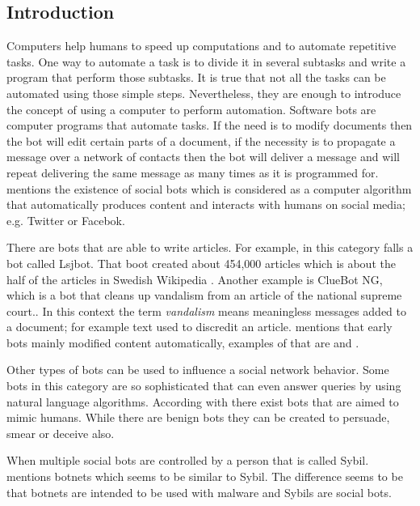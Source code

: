 \documentclass[twoside]{article}
\begin{document}
\begin{multicols}{2} %

\section{Introduction}
\lettrine[nindent=0em,lines=2]{C}omputers help humans to speed up computations and to automate repetitive tasks. One way to automate 
a task is to divide it in several subtasks and write a program that perform those subtasks. It is true that not all the tasks can be automated
using those simple steps. Nevertheless, they are enough to introduce the concept of using a computer to perform automation. Software bots 
are computer programs that automate tasks. If the need is to modify documents then the bot will edit certain parts of a document, if the
necessity is to propagate a message over a network of contacts then the bot will deliver a message and will repeat delivering the same
message as many times as it is programmed for. \cite{ferrara:2015} mentions the existence of social bots which is considered as a computer
algorithm that automatically produces content and interacts with humans on social media; e.g. Twitter or Facebok.

There are bots that are able to write articles. For example, in this category falls a bot called Lsjbot. That boot created about 454,000 articles 
which is about the half of the articles in Swedish Wikipedia \cite{guld:2013}. Another example is ClueBot NG, which is a bot that cleans up
vandalism from an article of the national supreme court.\cite{bbc07:2012}. In this context the term \emph{vandalism} means meaningless 
messages added to a document; for example text used to discredit an article. \cite{ferrara:2015} mentions that early bots mainly modified 
content automatically, examples of that are \cite{wikiWriter:2014} and \cite{wikiList:2014}.

Other types of bots can be used to influence a social network behavior. Some bots in this category are so sophisticated that can even 
answer queries by using natural language algorithms\cite{emerging:2014}. According with \cite{ferrara:2015} there exist bots that are aimed 
to mimic humans. While there are benign bots they can be created to persuade, smear or deceive also.



When multiple social bots are controlled by a person that is called Sybil\cite{ferrara:2015}. \cite{kuhn:2015} mentions botnets which seems to be similar to Sybil. The difference seems to be that botnets are intended to be used with malware and Sybils are social bots.





\end{multicols}
\end{document}
